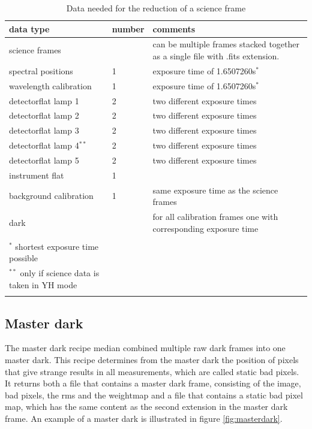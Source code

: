 \documentclass[twoside,single]{lion-msc}
\begin{document}
\begin{longtable}{| p{} | p{} | p{ }|}
\hline
\textbf{data type} & \textbf{number} & \textbf{comments}\\\hline
science frames&  &can be multiple frames stacked together as a single file with .fits extension.\\\hline
spectral positions & 1 & exposure time of 1.6507260s$^*$	\\\hline	
wavelength calibration & 1 & exposure time of 1.6507260s$^*$ \\\hline
detectorflat lamp 1 & 2 & two different exposure times\\\hline
detectorflat lamp 2 & 2 & two different exposure times\\\hline
detectorflat lamp 3 & 2 & two different exposure times\\\hline
detectorflat lamp 4$^{**}$ & 2 & two different exposure times\\\hline
detectorflat lamp 5 & 2 & two different exposure times\\\hline
instrument flat & 1 & \\\hline
background calibration & 1 & same exposure time as the science frames\\\hline
dark & & for all calibration frames one with corresponding exposure time\\\hline
\caption*{\\$^*$ shortest exposure time possible\\ $^{**}$ only if science data is taken in YH mode}\\%
\caption{Data needed for the reduction of a science frame}%
\label{Tab:data}
\end{longtable}%

\subsection{Master dark}
The master dark recipe median combined multiple raw dark frames into one master dark. This recipe determines from the master dark the position of pixels that give strange results in all measurements, which are called static bad pixels. It returns both a file that contains a master dark frame, consisting of the image, bad pixels, the rms and the weightmap and a file that contains a static bad pixel map, which has the same content as the second extension in the master dark frame. An example of a master dark is illustrated in figure \ref{fig:masterdark}. 
\bigskip
\end{document}
